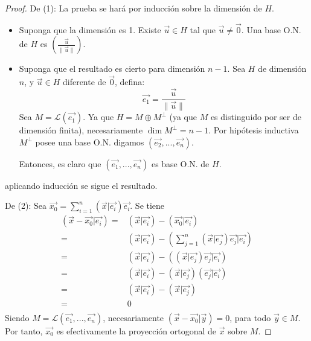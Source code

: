 \documentclass[12pt]{report}
\newcounter{it}
\theoremstyle{largebreak}
\newcommand\norm[1]{\ensuremath{\|#1\|}}
\newcommand\pint[2]{\ensuremath{\left(#1\big| #2\right)}}
\begin{document}
    \begin{proof}
        De (1): La prueba se hará por inducción sobre la dimensión de $H$.
        \begin{itemize}
            \item Suponga que la dimensión es 1. Existe $\vec{u}\in H$ tal que $\vec{u}\neq\vec{0}$. Una base O.N. de $H$ es $(\frac{\vec{u}}{\norm{\vec{u}}})$.
            \item Suponga que el resultado es cierto para dimensión $n-1$. Sea $H$ de dimensión $n$, y $\vec{u}\in H$ diferente de $\vec{0}$, defina:
            \begin{equation*}
                \vec{e_1}=\frac{\vec{u}}{\norm{\vec{u}}}
            \end{equation*}
            Sea $M=\mathcal{L}(\vec{e_1})$. Ya que $H=M\oplus M^\perp$ (ya que $M$ es distinguido por ser de dimensión finita), necesariamente $\dim M^\perp = n-1$. Por hipótesis inductiva $M^\perp$ posee una base O.N. digamos $(\vec{e_2},...,\vec{e_n})$.
            
            Entonces, es claro que $(\vec{e_1},...,\vec{e_n})$ es base O.N. de $H$.
        \end{itemize}
        aplicando inducción se sigue el resultado.

        De (2): Sea $\vec{x_0}=\sum_{ i=1}^{n}\pint{\vec{x}}{\vec{e_i}}\vec{e_i}$. Se tiene
        \begin{equation*}
            \begin{split}
                \pint{\vec{x}-\vec{x_0}}{\vec{e_i}}=&\pint{\vec{x}}{\vec{e_i}}-\pint{\vec{x_0}}{\vec{e_i}} \\
                =&\pint{\vec{x}}{\vec{e_i}}-\pint{\sum_{ j=1}^{n}\pint{\vec{x}}{\vec{e_j}}\vec{e_j}}{\vec{e_i}} \\
                =&\pint{\vec{x}}{\vec{e_i}}-\pint{\pint{\vec{x}}{\vec{e_j}}\vec{e_j}}{\vec{e_i}} \\
                =&\pint{\vec{x}}{\vec{e_i}}-\pint{\vec{x}}{\vec{e_j}}\pint{\vec{e_j}}{\vec{e_i}} \\
                =&\pint{\vec{x}}{\vec{e_i}}-\pint{\vec{x}}{\vec{e_j}}\\
                =&0\\
            \end{split}
        \end{equation*}
        Siendo $M=\mathcal{L}(\vec{e_1},...,\vec{e_n})$, necesariamente $\pint{\vec{x}-\vec{x_0}}{\vec{y}}=0$, para todo $\vec{y}\in M$. Por tanto, $\vec{x_0}$ es efectivamente la proyección ortogonal de $\vec{x}$ sobre $M$.
    \end{proof}
\end{document}
